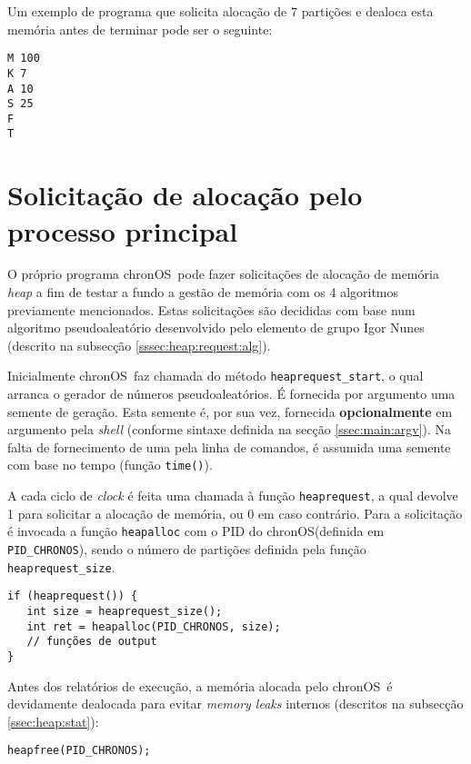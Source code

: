 \documentclass[10pt,oneside]{estiloUBI}
\newcommand{\chronOS}{\textsf{chronOS}}
\begin{document}
	Um exemplo de programa que solicita alocação de 7 partições e dealoca esta memória antes de terminar pode ser o seguinte:
	
	\begin{verbatim}
M 100
K 7
A 10
S 25
F
T
	\end{verbatim}
	
	
	\section{Solicitação de alocação pelo processo principal}
	\label{ssec:heap:request}
	
	O próprio programa \chronOS~pode fazer solicitações de alocação de memória \textit{heap} a fim de testar a fundo a gestão de memória com os 4 algoritmos previamente mencionados. Estas solicitações são decididas com base num algoritmo pseudoaleatório desenvolvido pelo elemento de grupo Igor Nunes (descrito na subsecção \ref{sssec:heap:request:alg}).
	
	Inicialmente \chronOS~faz chamada do método \verb|heaprequest_start|, o qual arranca o gerador de números pseudoaleatórios. É fornecida por argumento uma semente de geração. Esta semente é, por sua vez, fornecida \textbf{opcionalmente} em argumento pela \textit{shell} (conforme sintaxe definida na secção \ref{ssec:main:argv}). Na falta de fornecimento de uma pela linha de comandos, é assumida uma semente com base no tempo (função \verb|time()|).
	
	A cada ciclo de \textit{clock} é feita uma chamada à função \verb|heaprequest|, a qual devolve 1 para solicitar a alocação de memória, ou 0 em caso contrário. Para a solicitação é invocada a função \verb|heapalloc| com o PID do \chronOS (definida em \verb|PID_CHRONOS|), sendo o número de partições definida pela função \verb|heaprequest_size|.
	
	\begin{verbatim}
if (heaprequest()) {
   int size = heaprequest_size();
   int ret = heapalloc(PID_CHRONOS, size);
   // funções de output
}
	\end{verbatim}
	
	Antes dos relatórios de execução, a memória alocada pelo \chronOS~é devidamente dealocada para evitar \textit{memory leaks} internos (descritos na subsecção \ref{ssec:heap:stat}):
	
	\begin{verbatim}
heapfree(PID_CHRONOS);
	\end{verbatim}
	
\end{document}
